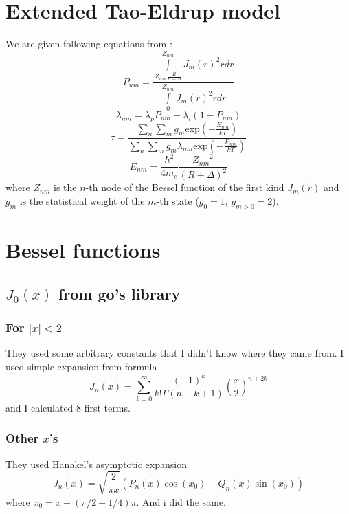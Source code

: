 \documentclass[a4paper]{article}
\begin{document}
	\section{Extended Tao-Eldrup model}
	We are given following equations from \cite{Zaleski2015}:
	\begin{equation}
		\label{eq1}
		P_{nm} = 
			\frac
				{\int\limits_{Z_{nm}\frac{R}{R+\Delta}}^{Z_{nm}}J_m(r)^2rdr}
				{\int\limits_0^{Z_{nm}}J_m(r)^2rdr}
	\end{equation}
	\begin{equation}
		\lambda_{nm} = \lambda_pP_{nm} + \lambda_i(1-P_{nm})
	\end{equation}
	\begin{equation}
		\tau =
			\frac
				{\sum\limits_n\sum\limits_mg_m\mathrm{exp}\left(-\frac{E_{nm}}{kT}\right)}
				{\sum\limits_n\sum\limits_mg_m\lambda_{nm}\mathrm{exp}\left(-\frac{E_{nm}}{kT}\right)}
	\end{equation}
	\begin{equation*}
		E_{nm} = \frac{\hbar^2}{4m_e}\frac{{Z_{nm}}^2}{(R+\Delta)^2}
	\end{equation*}
	where $Z_{nm}$ is the $n$-th node of the Bessel function of the
	first kind $J_m(r)$ and $g_m$ is the statistical weight of the $m$-th state
	($g_0 = 1$, $g_{m>0}=2$).
	\section{Bessel functions}
	\subsection{$J_0(x)$ from go's library}
	\subsubsection{For $|x| < 2$}
	They used some arbitrary constants that I didn't know where
	they came from. I used simple expansion from formula
	\begin{equation}
		J_n(x) = \sum_{k=0}^\infty \frac{(-1)^k}{k!\Gamma(n+k+1)} \left(\frac{x}{2}\right)^{n+2k}
	\end{equation}
	and I calculated 8 first terms.
	\subsubsection{Other $x$'s}
	They used Hanakel's asymptotic expansion 
	\begin{equation}
		J_n(x) = \sqrt{\frac{2}{\pi x}}\left(P_n(x)\cos(x_0) - Q_n(x)\sin(x_0)\right)
	\end{equation}
	where $x_0 = x - (\pi/2 + 1/4)\pi$. And i did the same.
\end{document}
